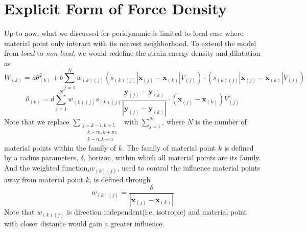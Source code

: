 \documentclass[a4paper,11pt,CJK]{paper}
\newcommand{\bfxj}{\textbf{x}_{(j)}}
\newcommand{\bfyj}{\textbf{y}_{(j)}}
\newcommand{\bfxk}{\textbf{x}_{(k)}}
\newcommand{\bfyk}{\textbf{y}_{(k)}}
\newcommand{\wkj}{w_{(k)(j)}}
\newcommand{\skj}{s_{(k)(j)}}
\newcommand{\thetak}{\theta_{(k)}}
\begin{document}
\section{Explicit Form of Force Density}
Up to now, what we discussed for peridynamic is limited to local case where material point only interact with its nearest neighborhood.
To extend the model from \textit{local} to \textit{non-local}, we would redefine the strain energy density and dilatation as
\begin{equation}
W_{(k)} = a\thetak^2
          +b\sum_{j=1}^{N}\wkj(\skj|\bfxj-\bfxk|V_{(j)})\cdot(\skj|\bfxj-\bfxk|V_{(j)})
\end{equation}
\begin{equation}
\thetak = d\sum_{j=1}^{N}\wkj\skj\frac{\bfyj - \bfyk}{|\bfyj - \bfyk|}\cdot(\bfxj-\bfxk)V_{(j)}
\end{equation}
Note that we replace $\sum_{\substack {j=k-l,k+l,\\ \quad k-m,k+m,\\ \quad k-n,k+n}}$ with $\sum_{j=1}^{N}$, where $N$ is the number of material points within the family of $k$.
The family of material point $k$ is defined by a radius parameters, $\delta$, horizon, within which all material points are its family.
And the weighted function,$\wkj$, used to control the influence material points away from material point $k$, is  defined through
\begin{equation}
\wkj = \frac{\delta}{|\bfxj-\bfxk|}
\end{equation}
Note that $\wkj$ is direction independent(i.e. isotropic) and material point with closer distance would gain a greater influence.
\end{document}
